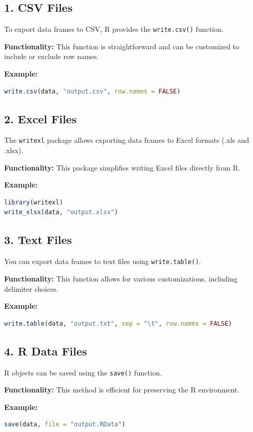 \documentclass[10pt]{book}
\begin{document}
\subsection{1. CSV Files}
To export data frames to CSV, R provides the \texttt{write.csv()} function.

\textbf{Functionality:} This function is straightforward and can be customized to include or exclude row names.

\textbf{Example:}
\begin{lstlisting}[language=R]
write.csv(data, "output.csv", row.names = FALSE)
\end{lstlisting}

\subsection{2. Excel Files}
The \texttt{writexl} package allows exporting data frames to Excel formats (.xls and .xlsx).

\textbf{Functionality:} This package simplifies writing Excel files directly from R.

\textbf{Example:}
\begin{lstlisting}[language=R]
library(writexl)
write_xlsx(data, "output.xlsx")
\end{lstlisting}

\subsection{3. Text Files}
You can export data frames to text files using \texttt{write.table()}.

\textbf{Functionality:} This function allows for various customizations, including delimiter choices.

\textbf{Example:}
\begin{lstlisting}[language=R]
write.table(data, "output.txt", sep = "\t", row.names = FALSE)
\end{lstlisting}

\subsection{4. R Data Files}
R objects can be saved using the \texttt{save()} function.

\textbf{Functionality:} This method is efficient for preserving the R environment.

\textbf{Example:}
\begin{lstlisting}[language=R]
save(data, file = "output.RData")
\end{lstlisting}
\end{document}
